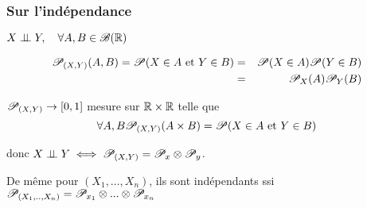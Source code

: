 \subsubsection{Sur l'indépendance}

$X \perp\!\!\! \perp Y, \quad \forall A,B \in \mathscr{B} (\mathbb{R})$ 

\begin{eqnarray*}
	\mathscr{P}_{(X,Y)}(A,B)= \mathscr{P} (X \in A \text{ et } Y \in B) 
	&=& \mathscr{P}(X\in A) \mathscr{P}(Y\in B)\\
	&=& \mathscr{P}_X(A) \mathscr{P}_Y( B)
\end{eqnarray*}


$\mathscr{P}_{(X,Y)} \to [0,1]$ mesure sur $\mathbb{R} \times \mathbb{R}$ telle que
$$\forall A,B\mathscr{P}_{(X,Y)}(A\times B) = \mathscr{P} (X\in A \text{ et } Y \in B)$$

donc $X \perp\!\!\! \perp Y\iff \mathscr{P}_{(X,Y)} = \mathscr{P}_x \otimes \mathscr{P}_y$.

De même pour $(X_1, \dots, X_n)$, ils sont indépendants ssi $\mathscr{P}_{(X_1,.., X_n)} =\mathscr{P}_{x_1} \otimes ... \otimes  \mathscr{P}_{x_n} $

